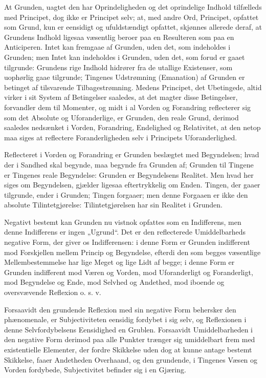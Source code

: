 \documentclass[11pt]{book}
\newcommand{\opage}[1]{\marginnote{\footnotesize\textit{[#1]}}}
\begin{document}
At Grunden, uagtet den har Oprindeligheden og det
oprindelige Indhold tilfælleds med Principet, dog ikke er
Principet selv; at, med andre Ord, Principet, opfattet som
Grund, kun er eensidigt og ufuldstændigt opfattet, skjønnes
allerede deraf, at Grundens Indhold ligesaa væsentlig beroer
paa en Resulteren som paa en Anticiperen. Intet kan
fremgaae af Grunden, uden det, som indeholdes i Grunden;
men Intet kan indeholdes i Grunden, uden det, som forud er
gaaet tilgrunde: Grundens rige Indhold hidrører fra de
utallige Existenser, som uophørlig gaae tilgrunde; Tingenes
Udstrømning (Emanation) af Grunden er betinget af
tilsvarende Tilbagestrømning. Medens Principet, det
Ubetingede, altid virker i sit System af Betingelser saaledes, at
det magter disse Betingelser, forvandler dem til Momenter, og
midt i al Vorden og Forandring reflecterer sig som det
Absolute og Uforanderlige, er Grunden, den reale Grund,
derimod saaledes nedsænket i Vorden, Forandring, Endelighed
og Relativitet, at den netop maa siges at reflectere
Foranderligheden selv i Principets Uforanderlighed.

Reflecteret i Vorden og Forandring er Grunden beslægtet med
Begyndelsen; hvad der i Sandhed skal begynde, maa begynde
fra Grunden af; Grunden til Tingene er Tingenes reale
Begyndelse: Grunden er Begyndelsens Realitet. Men hvad her
siges om Begyndelsen, gjælder ligesaa eftertrykkelig om Enden.
Tingen, der gaaer tilgrunde, ender i Grunden; Tingen
forgaaer; men denne Forgaaen er ikke den absolute
Tilintetgjørelse: Tilintetgjørelsen har sin Realitet i Grunden.

\opage{92} \setcounter{footnote}{0}%
Negativt bestemt kan Grunden nu vistnok opfattes som en
Indifferens, men denne Indifferens er ingen „Ugrund“. Det er
den reflecterede Umiddelbarheds negative Form, der giver os
Indifferensen: i denne Form er Grunden indifferent mod
Forskjellen mellem Princip og Begyndelse, efterdi den som
begges væsentlige Mellembestemmelse har lige Meget og lige
Lidt af begge; i denne Form er Grunden indifferent mod
Væren og Vorden, mod Uforanderligt og Foranderligt, mod
Begyndelse og Ende, mod Selvhed og Andethed, mod iboende
og oversvævende Reflexion o. s. v.

Forsaavidt den grundende Reflexion med sin negative Form
behersker den phænomenale, er Subjectiviteten eensidig
fordybet i sig selv, og Reflexionen i denne Selvfordybelsens
Eensidighed en Grublen. Forsaavidt Umiddelbarheden i den
negative Form derimod paa alle Punkter trænger sig
umiddelbart frem med existentielle Elementer, der fordre
Skikkelse uden dog at kunne antage bestemt Skikkelse, faaer
Andetheden Overhaand, og den grundende, i Tingenes Væsen
og Vorden fordybede, Subjectivitet befinder sig i en Gjæring.
\end{document}
